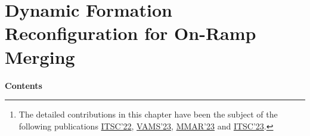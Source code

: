 
\chapter{Dynamic Formation Reconfiguration for On-Ramp Merging}

\label{Chap04}
\begin{abstract}
In scenarios involving conflicting mergings, the decision-making component of the C-MCA is tasked with determining a secure passing sequence for the MVS within the merging zone. The passing sequence is subsequently translated into the MVS dynamics in the planning level through the application of the formation reconfiguration mechanism. Within this chapter, several dynamic formation reconfiguration approaches for on-ramp merging will be discussed. Each proposed formation reconfiguration will be outlined, and its performance will be assessed to identify any limitations. These identified limitations will then guide the refinement of the formation reconfiguration mechanism, iteratively improving it until the planning objectives of the C-MCA are satisfactorily met\footnote{The detailed contributions in this chapter have been the subject of the following publications \hyperlink{ITSC22}{ITSC'22}, \hyperlink{VAMS23}{VAMS'23},  \hyperlink{MMAR23}{MMAR'23} and  \hyperlink{ITSC23}{ITSC'23}.}.
\end{abstract}


\textbf{Contents}
\vspace{0.15cm}
\hline
\hspace{2cm}
\localtableofcontents
\hspace{2cm}
\hline



















